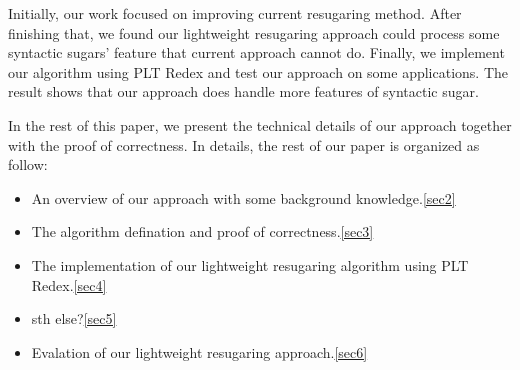 Initially, our work focused on improving current resugaring method. After finishing that, we found our lightweight resugaring approach could process some syntactic sugars' feature that current approach cannot do. Finally, we implement our algorithm using PLT Redex\cite{SEwPR} and test our approach on some applications. The result shows that our approach does handle more features of syntactic sugar.

In the rest of this paper, we present the technical details of our approach together with the proof of correctness. In details, the rest of our paper is organized as follow:

\begin{itemize}
\item An overview of our approach with some background knowledge.\ref{sec2}
\item The algorithm defination and proof of correctness.\ref{sec3}
\item The implementation of our lightweight resugaring algorithm using PLT Redex.\ref{sec4}
\item sth else?\ref{sec5}
\item Evalation of our lightweight resugaring approach.\ref{sec6}
\end{itemize}
